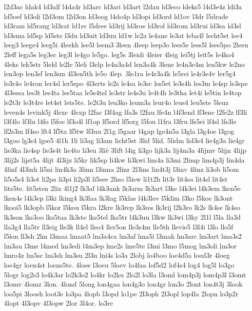 {l2d3ac
ldak4
ld3alf
l4da4r
ld3arc
ld3ari
ld3art
l2dau
ld3eco
ldeks5
l4d3e4z
ldi3a
ld5oef
ld3oli
l2d3om
l2d3on
ld3oog
l4do4p
ld3opi
ld3ord
ld1ov
l3dr
l5drade
ld3ram
ld5rang
ld3rat
ld1re
l5dree
ld3rij
ld3roe
ld3rol
ld3rom
ld3rui
ld3sa
ld3sl
ld3sma
ld5sp
ld5ste
l3du
ld3uit
ld3uu
ld1w
le2a
le4ane
le3at
leba4l
lecht5st
lee4
leeg3
leege4
leeg5i
4leekh
lee5l
leem3
3leen
4leep
leep3o
lees5e
lees5l
lees5po
2leeu
2leff
lega5s
leg3ec
leg3l
le4go
le5go.
leg5s
3leidi
4leier
4leig
lei5tj
leit5s
le4ko4
4leks
lek5str
5leld
le2le
5leli
l3elp
le4n3a4d
len3a4k
3lene
le4n3e4m
len5kw
le2no
len3op
len3sf
len3sm
4l3en5th
le5o
4lep.
3le1ra
le4r3a4k
le5rei
le4r3e4v
ler5g4
le3r4o
le4ron
ler4sl
ler5spo
4l3erts
le2s
le4sa
le3sc
les5et
le3s4h
les3m
le4sp
le3spe
4l3essa
les3t
les4ta
les5taa
le5s4tel
le3str
le4s3u
le4t4h
le3tha
let4i
le5tin
le4top
le2t3r
le3t4re
let4st
lets5te.
le2t3u
leu3ko
leum3a
leur4o
leus4
leu5ste
5leuz
leven4s
levink5j
4lexc
4lexp
l2fac
l3f4ag
lfa3s
l2fau
lfe4n
l4f3end
lf3ene
l2fe2z
lf3li
l3f4lo
lf3lu
l4fo
l5foe
lf3o4l
lf1op
lf5ord
lf5org
l5fou
l1fra
l3fru
lfs5ei
lf4sl
lfs3le
lf2s3m
lf4so
lft4
lf5ta
lf5tw
lf3uu
2l1g
l5gaar
l4gap
lge4n5a
l3gla
l3g4oe
l3gog
l3goo
lg3s4
lgse5
4l1h
1li
li3ag
li3am
licht5st
3lid
5lid.
5lidm
lid3s4
lie4g3a
lie4gr
lie3ka
lie4sp
lie3s4t
lie4to
li3eu
3liè
3lift
l4ig
li3go
lijk3a
lij4m3a
4lijmv
5lijn
4lijp
3lij2s
lijst5a
4lijt
4l3ijz
li5kr
lik5sp
li4kw
li3kwi
lim4a
li3mi
2limp
lim4p3j
lin4da
4linf
4l3inh
li5ni
lin4k3a
3linn
l3inna
2linr
2l3ins
lin4t3j
l3inv
4linz
li3ob
li5om
li5o5s4
li3ot
li2pa
li3pi
li2p3l
li5see
2liso
l5isw
li1t2h
lit3r
lit4sa
lit4sl
lit4st
lits5te.
lit5sten
2lix
4l1j2
lk3af
l4k3ank
lk3arm
lk3art
l3ke
l4k3ei
l4k3em
lken5e
lken4s
l4k3ep
l3ki
lking4
lk3laa
lk3lag
l5klas
l4k3lev
l5klim
l3ko
l5koe
lk3ont
lkooi5
lk3opb
l5kor
l5kou
l5kra
l2kre
lk3rep
lk3res
lk3rij
l2k3ro
lk2s
lk4se
lk4so
lk3son
lks3oo
lks5taa
lk3ste
lks5tel
lks5tr
l4k3uu
l3kw
lk3wi
l3ky
2l1l
l5la
lla3d
lla3g4
lla5tr
ll3eig
lle3k
ll4el
lleo4
ller5on
lle3s4m
lle5th
llevie5
l3l4i
l3lo
llo5f
l5lon
ll3sh
2lm
l3maa
lmaat5
lm3a4ca
lm3af
lma5ï
l3mak
lm3arc
lm3art
lma3s2
lm3au
l3me
l4med
lm3edi
l4m3ep
lme2s
lme5te
l3mi
l3mo
l5mog
lm3oli
lm3or
lmro4z
lm5sc
lm3sh
lm3su
2l3n
lni4s
lo3a
2lobj
lo4boo
loe4d5a
loed3r
4loeg
loe4gr
loen4st
loens5te.
4loes
l3oeu
5loev
lo4faa
lof5d2
lof4s4
log4
log5l
lo3go
5logr
log2s3
lo4k3ar
lo2k3o2
lo4kr
lo2ku
2lo2l
lo3la
l3oml
lom4p3j
lom4p3l
l3omt
l3omv
4lomz
3lon.
4lond
5long
lon4gaa
lon4g3o
lon4gr
lon3o
2lont
lon4t3j
3look
loo5pi
3loosh
loot3e
lo3pa
4lopb
l3opd
lo1pe
2l3oph
2l3opl
lop4la
2lopn
lo3p2r
4lopt
4l3opv
4l3opw
2lor
3l4or.
lo3re
}
